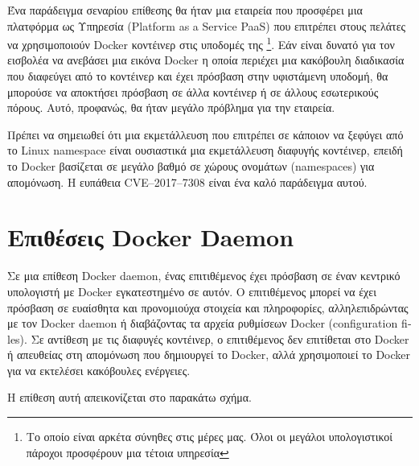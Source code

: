Ένα παράδειγμα σεναρίου επίθεσης θα ήταν μια εταιρεία που προσφέρει μια
πλατφόρμα ως Υπηρεσία (\textlatin{Platform as a Service PaaS}) που επιτρέπει
στους πελάτες να χρησιμοποιούν \textlatin{Docker} κοντέινερ στις υποδομές της
\footnote{Το οποίο είναι αρκέτα σύνηθες στις μέρες μας. Όλοι οι μεγάλοι
υπολογιστικοί πάροχοι προσφέρουν μια τέτοια υπηρεσία}.
Εάν είναι δυνατό για τον εισβολέα να ανεβάσει μια εικόνα \textlatin{Docker}
η οποία περιέχει μια κακόβουλη διαδικασία που διαφεύγει από το κοντέινερ και
έχει πρόσβαση στην υφιστάμενη υποδομή, θα μπορούσε να αποκτήσει πρόσβαση σε άλλα
κοντέινερ ή σε άλλους εσωτερικούς πόρους. Αυτό, προφανώς, θα ήταν μεγάλο
πρόβλημα για την εταιρεία.

Πρέπει να σημειωθεί ότι μια εκμετάλλευση που επιτρέπει σε κάποιον να ξεφύγει
από το \textlatin{Linux namespace} είναι ουσιαστικά μια εκμετάλλευση
διαφυγής κοντέινερ, επειδή το \textlatin{Docker} βασίζεται σε μεγάλο βαθμό σε
χώρους ονομάτων (\textlatin{namespaces}) για απομόνωση.
Η ευπάθεια \textlatin{CVE–2017–7308} \cite{CVE-2017-7308} είναι ένα καλό
παράδειγμα αυτού.

\section{Επιθέσεις \textlatin{Docker Daemon}}

Σε μια επίθεση \textlatin{Docker daemon}, ένας επιτιθέμενος έχει πρόσβαση σε
έναν κεντρικό υπολογιστή με \textlatin{Docker} εγκατεστημένο σε αυτόν. Ο
επιτιθέμενος μπορεί να έχει πρόσβαση σε ευαίσθητα και προνομιούχα στοιχεία και
πληροφορίες, αλληλεπιδρώντας με τον \textlatin{Docker daemon} ή διαβάζοντας τα
αρχεία ρυθμίσεων \textlatin{Docker (configuration files)}. Σε αντίθεση με
τις διαφυγές κοντέινερ, ο επιτιθέμενος δεν επιτίθεται στο \textlatin{Docker}
ή απευθείας στη απομόνωση που δημιουργεί το \textlatin{Docker}, αλλά
χρησιμοποιεί το \textlatin{Docker} για να εκτελέσει κακόβουλες ενέργειες.

Η επίθεση αυτή απεικονίζεται στο παρακάτω σχήμα.


